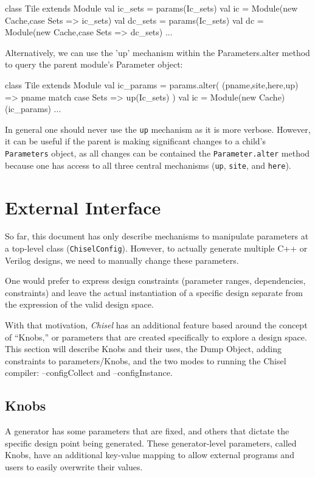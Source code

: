 \documentclass[10pt,twocolumn]{article}
\def\code#1{{\small\tt #1}}
\begin{document}
\begin{scala}
class Tile extends Module {
  val ic_sets = params(Ic_sets)
  val ic = Module(new Cache,{case Sets => ic_sets})
  val dc_sets = params(Ic_sets)
  val dc = Module(new Cache,{case Sets => dc_sets})
    ...
}
\end{scala}
Alternatively, we can use the 'up' mechanism within the Parameters.alter method to query the parent module's Parameter object:
\begin{scala}
class Tile extends Module {
  val ic_params = params.alter(
    (pname,site,here,up) => pname match {
      case Sets => up(Ic_sets)
    }
  )
  val ic = Module(new Cache)(ic_params)
  ...
}
\end{scala}
In general one should never use the \code{up} mechanism as it is more verbose. However, it can be useful if the parent is making significant changes to a child's \code{Parameters} object, as all changes can be contained the \code{Parameter.alter} method because one has access to all three central mechanisms (\code{up}, \code{site}, and \code{here}).

\section{External Interface}
\label{sec:knobs}

So far, this document has only describe mechanisms to manipulate parameters at a top-level class (\code{ChiselConfig}). However, to actually generate multiple C++ or Verilog designs, we need to manually change these parameters.

One would prefer to express design constraints (parameter ranges, dependencies, constraints) and leave the actual instantiation of a specific design separate from the expression of the valid design space.

With that motivation, {\em Chisel} has an additional feature based around the concept of ``Knobs,'' or parameters that are created specifically to explore a design space. This section will describe Knobs and their uses, the Dump Object, adding constraints to parameters/Knobs, and the two modes to running the Chisel compiler: --configCollect and --configInstance.

\subsection{Knobs}
A generator has some parameters that are fixed, and others that dictate the specific design point being generated. These generator-level parameters, called Knobs, have an additional key-value mapping to allow external programs and users to easily overwrite their values.
\end{document}
